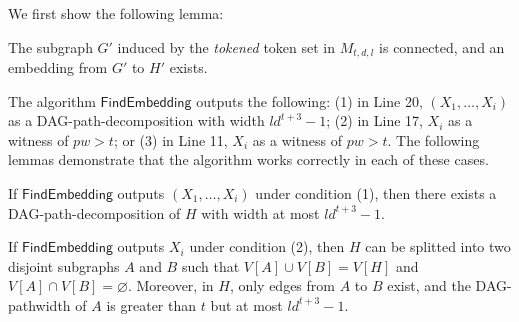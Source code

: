 \documentclass[runningheads]{llncs}
\theoremstyle{plain}
\theoremstyle{definition}
\begin{document}


We first show the following lemma:

\begin{lemma}\label{lemma_embedding}
    The subgraph $G'$ induced by the \textit{tokened} token set in $M_{t, d, l}$ is connected, and an embedding from $G'$ to $H'$ exists.
\end{lemma}




The algorithm $\mathsf{FindEmbedding}$ outputs the following: (1) in Line 20, $(X_1,\ldots,\allowbreak{}X_i)$ as a DAG-path-decomposition with width $ld^{t+3}-1$; (2) in Line 17, $X_i$ as a witness of $pw > t$; or (3) in Line 11, $X_i$ as a witness of $pw > t$. The following lemmas demonstrate that the algorithm works correctly in each of these cases.

\begin{lemma}\label{lemma_(1)}
    If $\mathsf{FindEmbedding}$ outputs $(X_1,\ldots,\allowbreak{}X_i)$ under condition (1), then there exists a DAG-path-decomposition of $H$ with width at most $ld^{t+3}-1$.
\end{lemma}


\begin{lemma}\label{lemma_(2)}
    If $\mathsf{FindEmbedding}$ outputs $X_i$ under condition (2), then $H$ can be splitted into two disjoint subgraphs $A$ and $B$ such that $V[A] \cup V[B] = V[H]$ and $V[A] \cap V[B] = \varnothing$. Moreover, in $H$, only edges from $A$ to $B$ exist, and the DAG-pathwidth of $A$ is greater than $t$ but at most $ld^{t+3}-1$.
\end{lemma}
\end{document}
